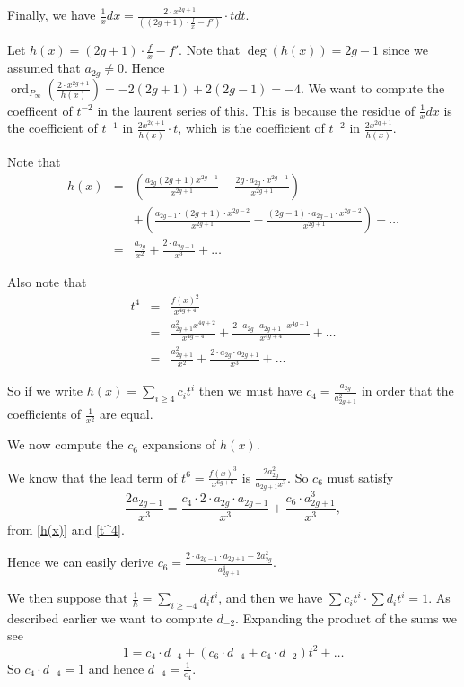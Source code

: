\documentclass[draft, 11pt]{article} %
\theoremstyle{plain}
\theoremstyle{remark}
\DeclareMathOperator{\ord}{ord}
\begin{document}
Finally, we have $\frac{1}{x}dx = \frac {2\cdot x^{2g+1}}{\left ( (2g+1)\cdot \frac{f}{x} - f' \right )} \cdot t dt$.

Let $h(x) = (2g+1)\cdot \frac{f}{x} - f'$.
Note that $\deg(h(x)) = 2g-1$ since we assumed that $a_{2g}\neq 0$.
Hence $\ord_{P_\infty}\left ( \frac{2\cdot x^{2g+1}}{h(x)} \right ) = -2(2g+1) + 2(2g-1) = -4$.
We want to compute the coefficent of $t^{-2}$ in the laurent series of this.
This is because the residue of $\frac{1}{x}dx$ is the coefficient of $t^{-1}$ in $\frac{2x^{2g+1}}{h(x)}\cdot t$, which is the coefficient of $t^{-2}$ in $\frac{2x^{2g+1}}{h(x)}$.


Note that 
\begin{eqnarray}\label{h(x)}
h(x) & = & \left( \frac{a_{2g}(2g+1)x^{2g-1}}{x^{2g+1}} - \frac{2g\cdot a_{2g}\cdot x^{2g-1}}{x^{2g+1}} \right) \nonumber \\
& ~ & + \left(\frac{a_{2g-1}\cdot(2g+1)\cdot x^{2g-2}}{x^{2g+1}} - \frac{(2g-1)\cdot a_{2g-1} \cdot x^{2g-2}}{x^{2g+1}} \right) + \ldots \nonumber \\
& = & \frac{a_{2g}}{x^2} + \frac{2\cdot a_{2g-1}}{x^3} + \ldots
\end{eqnarray}

Also note that 
\begin{eqnarray}\label{t^4}
t^4 & = & \frac{f(x)^2}{x^{4g+4}} \nonumber \\
& = & \frac{a_{2g+1}^2 x^{4g+2}}{x^{4g+4}} + \frac{2\cdot a_{2g}\cdot a_{2g+1} \cdot x^{4g+1}}{x^{4g+4}} + \ldots \nonumber \\
& = & \frac{a_{2g+1}^2}{x^2} + \frac{2\cdot a_{2g} \cdot a_{2g+1}}{x^3} + \ldots
\end{eqnarray}

So if we write $h(x) = \sum_{i\geq 4} c_i t^i$ then we must have $c_4 = \frac{a_{2g}}{a_{2g+1}^2}$ in order that the coefficients of $\frac{1}{x^2}$ are equal.

We now compute the $c_6$ expansions of $h(x)$.

We know that the lead term of $t^6 = \frac{f(x)^3}{x^{6g+6}}$ is $\frac{2a_{2g}^2}{a_{2g+1}x^3}$.
So $c_6$ must satisfy
\[
\frac{2a_{2g-1}}{x^3} = \frac{c_4\cdot 2 \cdot a_{2g} \cdot a_{2g+1}}{x^3} + \frac{c_6 \cdot a_{2g+1}^3}{x^3},
\]
from \eqref{h(x)} and \eqref{t^4}.

Hence we can easily derive $c_6 = \frac{2\cdot a_{2g-1} \cdot a_{2g+1} - 2a_{2g}^2}{a_{2g+1}^4}$.


We then suppose that $\frac{1}{h}  = \sum_{i\geq -4} d_it^i$, and then we have $\sum c_it^i \cdot \sum d_it^i = 1$.
As described earlier we want to compute $d_{-2}$.
Expanding the product of the sums we see
\[
1 = c_4\cdot d_{-4} + (c_6\cdot d_{-4} + c_4\cdot d_{-2})t^2 + \ldots
\]
So $c_4 \cdot d_{-4} = 1$ and hence $d_{-4} = \frac{1}{c_4}$.
\end{document}
